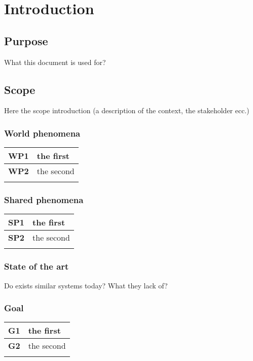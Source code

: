 \section{Introduction}\label{intro}

\subsection{Purpose}
What this document is used for?

\subsection{Scope}
Here the scope introduction (a description of the context, the stakeholder ecc.)
\subsubsection*{World phenomena}
\begin{table}[h]
    \begin{tabular}{|l|l|}
        \toprule
        \textbf{WP1} & the first  \\ \midrule
        \textbf{WP2} & the second \\ \midrule
                     &            \\ \bottomrule
    \end{tabular}
\end{table}
\subsubsection*{Shared phenomena}
\begin{table}[h]
    \begin{tabular}{|l|l|}
        \toprule
        \textbf{SP1} & the first  \\ \midrule
        \textbf{SP2} & the second \\ \midrule
                     &            \\ \bottomrule
    \end{tabular}
\end{table}
\subsubsection*{State of the art}
Do exists similar systems today? What they lack of?
\subsubsection*{Goal}
\begin{table}[h]
    \begin{tabular}{|l|l|}
        \toprule
        \textbf{G1} & the first  \\ \midrule
        \textbf{G2} & the second \\ \midrule
                    &            \\ \bottomrule
    \end{tabular}
\end{table}


